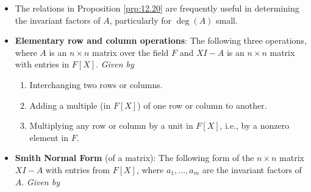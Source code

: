 \documentclass[../notes.tex]{subfiles}
\begin{document}
\begin{itemize}
\begin{lemma}
\begin{enumerate}
\begin{equation*}
\begin{pmatrix}
                \end{pmatrix}
            \end{equation*}
            given by the direct sum of matrices $A_1,\dots,A_k$, then the characteristic polynomial of $M$ is the product of the characteristic polynomials of $A_1,\dots,A_k$.
        \end{enumerate}
        \begin{proof}
            See the exercises.
        \end{proof}
    \end{lemma}
    \begin{proposition}\label{prp:12.20}
        Let $A$ be an $n\times n$ matrix over the field $F$.
        \begin{enumerate}
            \item The characteristic polynomial of $A$ is the product of all the invariant factors of $A$.
            \item (The Cayley-Hamilton Theorem) The minimal polynomial of $A$ divides the characteristic polynomial of $A$.
            \item The characteristic polynomial of $A$ divides some power of the minimal polynomial of $A$. In particular, these polynomials have the same roots, not counting multiplicities.
        \end{enumerate}
        \begin{proof}
            Given.
        \end{proof}
    \end{proposition}
    \item The relations in Proposition \ref{prp:12.20} are frequently useful in determining the invariant factors of $A$, particularly for $\deg(A)$ small.
    \item \textbf{Elementary row and column operations}: The following three operations, where $A$ is an $n\times n$ matrix over the field $F$ and $XI-A$ is an $n\times n$ matrix with entries in $F[X]$. \emph{Given by}
    \begin{enumerate}[label={(\roman*)}]
        \item Interchanging two rows or columns.
        \item Adding a multiple (in $F[X]$) of one row or column to another.
        \item Multiplying any row or column by a unit in $F[X]$, i.e., by a nonzero element in $F$.
    \end{enumerate}
    \item \textbf{Smith Normal Form} (of a matrix): The following form of the $n\times n$ matrix $XI-A$ with entries from $F[X]$, where $a_1,\dots,a_m$ are the invariant factors of $A$. \emph{Given by}

\end{itemize}
\end{document}
